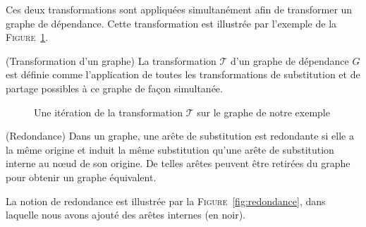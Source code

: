 Ces deux transformations sont appliquées simultanément afin de
transformer un graphe de dépendance. Cette transformation est illustrée
par l'exemple de la \textsc{Figure}~\ref{fig:etape_de_monomorphisation}.

\begin{mydef} (Transformation d'un graphe)
La transformation $\mathcal{T}$ d'un graphe de dépendance $G$ est définie comme l'application de toutes les transformations de substitution et de partage possibles à ce graphe de façon simultanée.
\end{mydef}

\begin{figure}
\begin{center}
\end{center}
\caption{Une itération de la transformation $\mathcal{T}$ sur le graphe de notre exemple}
\label{fig:etape_de_monomorphisation}
\end{figure}


\begin{mydef} (Redondance) Dans un graphe, une arête de substitution est
  redondante si elle a la m\^eme origine et induit la m\^eme
  substitution qu'une arête de substitution interne au nœud de son
  origine. De telles arêtes peuvent être retirées du graphe pour obtenir
  un graphe équivalent.
\end{mydef}

La notion de redondance est illustrée par la \textsc{Figure}~\ref{fig:redondance}, dans laquelle nous avons ajouté des arêtes internes (en noir).

